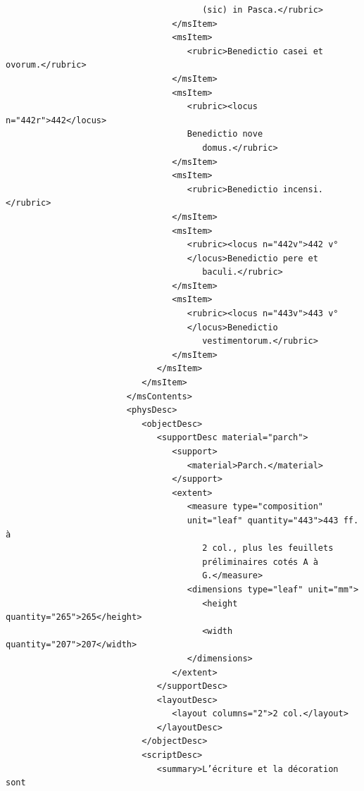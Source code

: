\documentclass[a4paper,12pt,twoside]{book}
\begin{document}
\begin{verbatim}
                                       (sic) in Pasca.</rubric>
                                 </msItem>
                                 <msItem>
                                    <rubric>Benedictio casei et ovorum.</rubric>
                                 </msItem>
                                 <msItem>
                                    <rubric><locus n="442r">442</locus>
                                    Benedictio nove
                                       domus.</rubric>
                                 </msItem>
                                 <msItem>
                                    <rubric>Benedictio incensi.</rubric>
                                 </msItem>
                                 <msItem>
                                    <rubric><locus n="442v">442 v°
                                    </locus>Benedictio pere et
                                       baculi.</rubric>
                                 </msItem>
                                 <msItem>
                                    <rubric><locus n="443v">443 v°
                                    </locus>Benedictio
                                       vestimentorum.</rubric>
                                 </msItem>
                              </msItem>
                           </msItem>
                        </msContents>
                        <physDesc>
                           <objectDesc>
                              <supportDesc material="parch">
                                 <support>
                                    <material>Parch.</material>
                                 </support>
                                 <extent>
                                    <measure type="composition" 
                                    unit="leaf" quantity="443">443 ff. à
                                       2 col., plus les feuillets 
                                       préliminaires cotés A à
                                       G.</measure>
                                    <dimensions type="leaf" unit="mm">
                                       <height quantity="265">265</height>
                                       <width quantity="207">207</width>
                                    </dimensions>
                                 </extent>
                              </supportDesc>
                              <layoutDesc>
                                 <layout columns="2">2 col.</layout>
                              </layoutDesc>
                           </objectDesc>
                           <scriptDesc>
                              <summary>L’écriture et la décoration sont

\end{verbatim}
\end{document}
